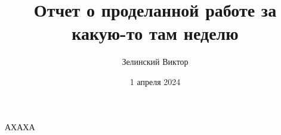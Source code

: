 \documentclass[a4paper, 12pt]{report}
\title{Отчет о проделанной работе за какую-то там неделю}
\author{Зелинский Виктор}
\date{1 апреля 2024}
\begin{document}
	\maketitle
	\newpage
	АХАХА
\end{document}
